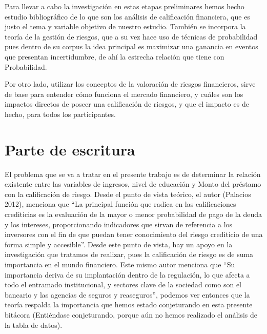 \documentclass[
  letterpaper,
  DIV=11,
  numbers=noendperiod]{scrreprt}
\begin{document}
Para llevar a cabo la investigación en estas etapas preliminares hemos
hecho estudio bibliográfico de lo que son los análisis de calificación
financiera, que es justo el tema y variable objetivo de nuestro estudio.
También se incorpora la teoría de la gestión de riesgos, que a su vez
hace uso de técnicas de probabilidad pues dentro de su corpus la idea
principal es maximizar una ganancia en eventos que presentan
incertidumbre, de ahí la estrecha relación que tiene con Probabilidad.

Por otro lado, utilizar los conceptos de la valoración de riesgos
financieros, sirve de base para entender cómo funciona el mercado
financiero, y cuáles son los impactos directos de poseer una
calificación de riesgos, y que el impacto es de hecho, para todos los
participantes.

\section{Parte de escritura}\label{parte-de-escritura}

El problema que se va a tratar en el presente trabajo es de determinar
la relación existente entre las variables de ingresos, nivel de
educación y Monto del préstamo con la calificación de riesgo. Desde el
punto de vista teórico, el autor (Palacios 2012), menciona que ``La
principal función que radica en las calificaciones crediticias es la
evaluación de la mayor o menor probabilidad de pago de la deuda y los
intereses, proporcionando indicadores que sirvan de referencia a los
inversores con el fin de que puedan tener conocimiento del riesgo
crediticio de una forma simple y accesible''. Desde este punto de vista,
hay un apoyo en la investigación que tratamos de realizar, pues la
calificación de riesgo es de suma importancia en el mundo financiero.
Este mismo autor menciona que ``Su importancia deriva de su implantación
dentro de la regulación, lo que afecta a todo el entramado
institucional, y sectores clave de la sociedad como son el bancario y
las agencias de seguros y reaseguros'', podemos ver entonces que la
teoría respalda la importancia que hemos estado conjeturando en esta
presente bitácora (Entiéndase conjeturando, porque aún no hemos
realizado el análisis de la tabla de datos).
\end{document}
